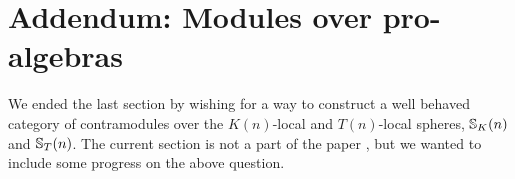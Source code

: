 
\section{Addendum: Modules over pro-algebras}

We ended the last section by wishing for a way to construct a well behaved category of contramodules over the $K(n)$-local and $T(n)$-local spheres, $\mathbb{S}_K(n)$ and $\mathbb{S}_T(n)$. The current section is not a part of the paper \cite{aambo_2024_positselski}, but we wanted to include some progress on the above question. 